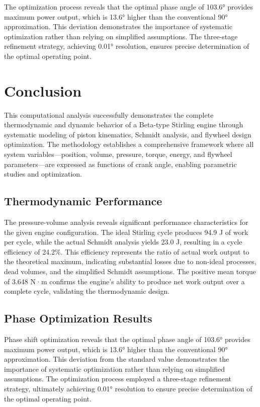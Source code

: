 \documentclass[12pt]{article}
\begin{document}
The optimization process reveals that the optimal phase angle of 103.6° provides maximum power output, which is 13.6° higher than the conventional 90° approximation. This deviation demonstrates the importance of systematic optimization rather than relying on simplified assumptions. The three-stage refinement strategy, achieving 0.01° resolution, ensures precise determination of the optimal operating point.


\section{Conclusion}
This computational analysis successfully demonstrates the complete thermodynamic and dynamic behavior of a Beta-type Stirling engine through systematic modeling of piston kinematics, Schmidt analysis, and flywheel design optimization. The methodology establishes a comprehensive framework where all system variables—position, volume, pressure, torque, energy, and flywheel parameters—are expressed as functions of crank angle, enabling parametric studies and optimization.

\subsection{Thermodynamic Performance}
The pressure-volume analysis reveals significant performance characteristics for the given engine configuration. The ideal Stirling cycle produces 94.9 J of work per cycle, while the actual Schmidt analysis yields 23.0 J, resulting in a cycle efficiency of 24.2\%. This efficiency represents the ratio of actual work output to the theoretical maximum, indicating substantial losses due to non-ideal processes, dead volumes, and the simplified Schmidt assumptions. The positive mean torque of 3.648 N·m confirms the engine's ability to produce net work output over a complete cycle, validating the thermodynamic design.

\subsection{Phase Optimization Results}
Phase shift optimization reveals that the optimal phase angle of 103.6° provides maximum power output, which is 13.6° higher than the conventional 90° approximation. This deviation from the standard value demonstrates the importance of systematic optimization rather than relying on simplified assumptions. The optimization process employed a three-stage refinement strategy, ultimately achieving 0.01° resolution to ensure precise determination of the optimal operating point.
\end{document}

